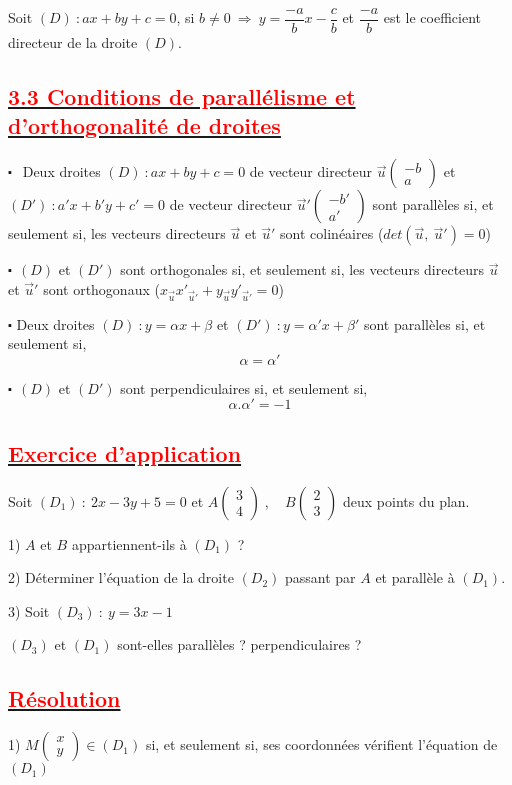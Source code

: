 \documentclass[12pt]{article}
\begin{document}
Soit $(D) \: : ax+by+c=0$, si $b\neq 0 \: \Rightarrow \: y=\dfrac{-a}{b}x-\dfrac{c}{b}$ et $\dfrac{-a}{b}$ est le coefficient directeur de la droite $(D).$
\subsection*{\underline{\textcolor{red}{\textbf{3.3 Conditions de parallélisme et d'orthogonalité de droites}}}}
$\centerdot\ \ $ Deux droites $(D) \: : ax+by+c=0$ de vecteur directeur $\vec{u}\begin{pmatrix} -b\\ a \end{pmatrix}$ et $(D') \: : a'x+b'y+c'=0$ de vecteur directeur $\vec{u}'\begin{pmatrix} -b'\\ a' \end{pmatrix}$ sont parallèles si, et seulement si, les vecteurs directeurs $\vec{u}$ et $\vec{u}'$ sont colinéaires ($det(\vec{u},\ \vec{u}')=0$)

$\centerdot\ \ (D)$ et $(D')$ sont orthogonales si, et seulement si, les vecteurs directeurs $\vec{u}$ et $\vec{u}'$ sont orthogonaux ($x_{\vec{u}}x'_{\vec{u}'}+y_{\vec{u}}y'_{\vec{u}'}=0$)

$\centerdot$ Deux droites $(D) \: : y=\alpha x+\beta$ et $(D') \: : y=\alpha' x+\beta'$ sont parallèles si, et seulement si, $$\alpha=\alpha'$$

$\centerdot\ \ (D)$ et $(D')$ sont perpendiculaires si, et seulement si, $$\alpha.\alpha'=-1$$
\subsection*{\underline{\textcolor{red}{\textbf{Exercice d'application}}}}
Soit $(D_{1})\ :\ 2x-3y+5=0$ et $A\begin{pmatrix} 3 \\ 4\end{pmatrix}\;,\quad B\begin{pmatrix} 2 \\ 3\end{pmatrix}$ deux points du plan.

1) $A$ et $B$ appartiennent-ils à $(D_{1})$ ?

2) Déterminer l'équation de la droite $(D_{2})$ passant par $A$ et parallèle à $(D_{1}).$

3) Soit $(D_{3})\ :\ y=3x-1$

$(D_{3})$ et $(D_{1})$ sont-elles parallèles ? perpendiculaires ?
\subsection*{\underline{\textcolor{red}{\textbf{Résolution}}}}
1) $M\begin{pmatrix} x \\ y\end{pmatrix}\in(D_{1})$ si, et seulement si, ses coordonnées vérifient l'équation de $(D_{1})$
\end{document}
